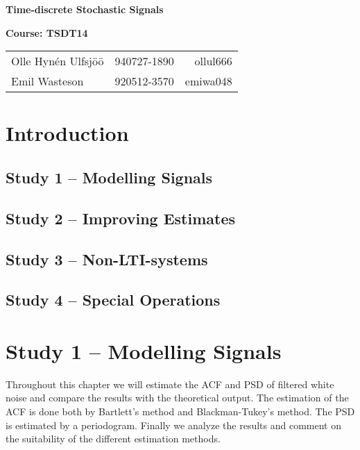 \documentclass[10pt]{article}
\begin{document}
\begin{center}

{\huge{\textbf{Time-discrete Stochastic Signals}}}

\vspace{3em}
\Large
\textbf{Course: TSDT14}
\vspace{3em}

\begin{tabular}{l r r}
  
Olle Hynén Ulfsjöö & 940727-1890 & ollul666 \\
Emil Wasteson & 920512-3570 & emiwa048 
\end{tabular}

\end{center}

\newpage
\tableofcontents
\newpage

\section{Introduction}


\subsection{Study 1 – Modelling Signals}

\subsection{Study 2 – Improving Estimates}

\subsection{Study 3 – Non-LTI-systems}

\subsection{Study 4 – Special Operations}



\pagebreak

\section{Study 1 – Modelling Signals}
Throughout this chapter we will estimate the ACF and PSD of filtered white noise and compare the results with the theoretical output. The estimation of the ACF is done both by Bartlett's method and Blackman-Tukey's method. The PSD is estimated by a periodogram. Finally we analyze the results and comment on the suitability of the different estimation methods.
\end{document}
